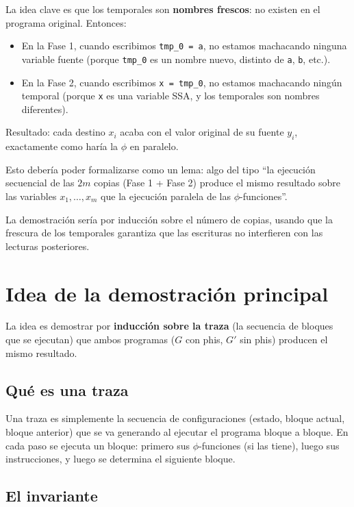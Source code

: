 \documentclass[12pt, a4paper]{article}
\begin{document}
La idea clave es que los temporales son \textbf{nombres frescos}: no existen en el
programa original. Entonces:

\begin{itemize}
  \item En la Fase 1, cuando escribimos \texttt{tmp\_0 = a}, no estamos machacando
    ninguna variable fuente (porque \texttt{tmp\_0} es un nombre nuevo, distinto de
    \texttt{a}, \texttt{b}, etc.).
  \item En la Fase 2, cuando escribimos \texttt{x = tmp\_0}, no estamos machacando
    ningún temporal (porque \texttt{x} es una variable SSA, y los temporales son
    nombres diferentes).
\end{itemize}

Resultado: cada destino $x_i$ acaba con el valor original de su fuente $y_i$, exactamente
como haría la $\phi$ en paralelo.

Esto debería poder formalizarse como un lema: algo del tipo ``la ejecución secuencial
de las $2m$ copias (Fase 1 + Fase 2) produce el mismo resultado sobre las variables
$x_1, \ldots, x_m$ que la ejecución paralela de las $\phi$-funciones''.

La demostración sería por inducción sobre el número de copias, usando que la frescura
de los temporales garantiza que las escrituras no interfieren con las lecturas posteriores.

\section{Idea de la demostración principal}

La idea es demostrar por \textbf{inducción sobre la traza} (la secuencia de bloques
que se ejecutan) que ambos programas ($G$ con phis, $G'$ sin phis) producen el mismo
resultado.

\subsection{Qué es una traza}

Una traza es simplemente la secuencia de configuraciones (estado, bloque actual, bloque
anterior) que se va generando al ejecutar el programa bloque a bloque. En cada paso se
ejecuta un bloque: primero sus $\phi$-funciones (si las tiene), luego sus instrucciones,
y luego se determina el siguiente bloque.

\subsection{El invariante}
\end{document}
